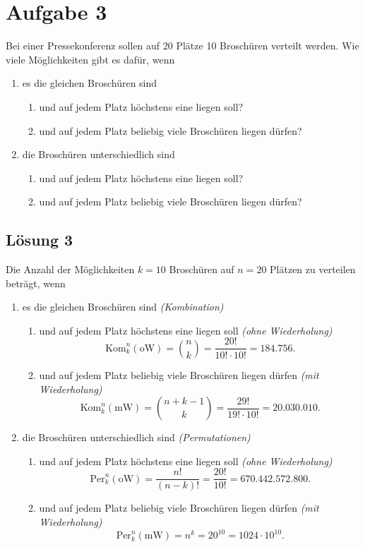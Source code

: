 \documentclass[main.tex]{subfiles}
\begin{document}
\section{Aufgabe 3}
Bei einer Pressekonferenz sollen auf 20 Plätze 10 Broschüren verteilt werden. Wie viele Möglichkeiten gibt es dafür, wenn

\begin{enumerate}
    \item es die gleichen Broschüren sind
    \begin{enumerate}
        \item und auf jedem Platz höchstens eine liegen soll?
        \item und auf jedem Platz beliebig viele Broschüren liegen dürfen?
    \end{enumerate}
    \item die Broschüren unterschiedlich sind
    \begin{enumerate}
        \item und auf jedem Platz höchstens eine liegen soll?
        \item und auf jedem Platz beliebig viele Broschüren liegen dürfen?
    \end{enumerate}
\end{enumerate}

\subsection{Lösung 3}
Die Anzahl der Möglichkeiten $k=10$ Broschüren auf $n=20$ Plätzen zu verteilen beträgt, wenn

\begin{enumerate}
    \item es die gleichen Broschüren sind \textit{(Kombination)}
    \begin{enumerate}
        \item und auf jedem Platz höchstens eine liegen soll \textit{(ohne Wiederholung)}
        $$ \text{Kom}^n_k(\text{oW}) = \binom{n}{k} = \frac{20!}{10!\cdot 10!} = 184.756. $$
        \item und auf jedem Platz beliebig viele Broschüren liegen dürfen \textit{(mit Wiederholung)}
        $$ \text{Kom}^n_k(\text{mW}) = \binom{n+k-1}{k} = \frac{29!}{19!\cdot 10!} = 20.030.010. $$
    \end{enumerate}
    \item die Broschüren unterschiedlich sind \textit{(Permutationen)}
    \begin{enumerate}
        \item und auf jedem Platz höchstens eine liegen soll \textit{(ohne Wiederholung)}
        $$ \text{Per}^n_k(\text{oW}) = \frac{n!}{(n-k)!} = \frac{20!}{10!} = 670.442.572.800. $$
        \item und auf jedem Platz beliebig viele Broschüren liegen dürfen \textit{(mit Wiederholung)}
        $$ \text{Per}^n_k(\text{mW}) = n^k = 20^{10} = 1024\cdot 10^{10}. $$
    \end{enumerate}
\end{enumerate}
\end{document}
